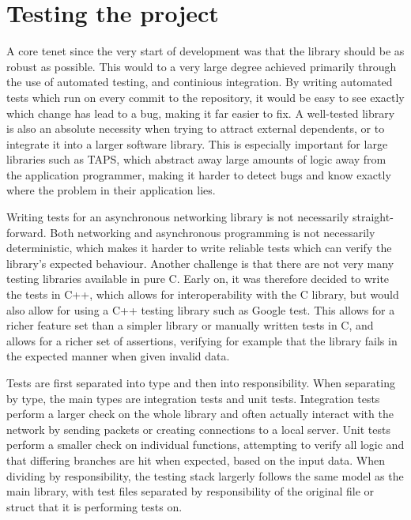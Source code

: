 \section{Testing the project}
A core tenet since the very start of development was that the library should be
as robust as possible. This would to a very large degree achieved primarily through
the use of automated testing, and continious integration. By writing automated tests
which run on every commit to the repository, it would be easy to see exactly which change
has lead to a bug, making it far easier to fix. A well-tested library is also an absolute
necessity when trying to attract external dependents, or to integrate it into a larger software
library. This is especially important for large libraries such as TAPS, which abstract away
large amounts of logic away from the application programmer, making it harder to detect bugs
and know exactly where the problem in their application lies.

Writing tests for an asynchronous networking library is not necessarily straight-forward.
Both networking and asynchronous programming is not necessarily deterministic, which makes
it harder to write reliable tests which can verify the library's expected behaviour. Another
challenge is that there are not very many testing libraries available in pure C. Early on,
it was therefore decided to write the tests in C++, which allows for interoperability with the C
library, but would also allow for using a C++ testing library such as Google test. \cite{GoogleTest2025}
This allows for a richer feature set than a simpler library or manually written tests in C,
and allows for a richer set of assertions, verifying for example that the library fails in the expected
manner when given invalid data.

Tests are first separated into type and then into responsibility. When separating
by type, the main types are integration tests and unit tests. Integration tests perform a larger check on the
whole library and often actually interact with the network by sending packets or creating
connections to a local server. 
Unit tests perform a smaller check on individual functions, attempting to verify
all logic and that differing branches are hit when expected, based on the input data.
When dividing by responsibility, the testing stack largerly follows the same model
as the main library, with test files separated by responsibility of the original
file or struct that it is performing tests on.

